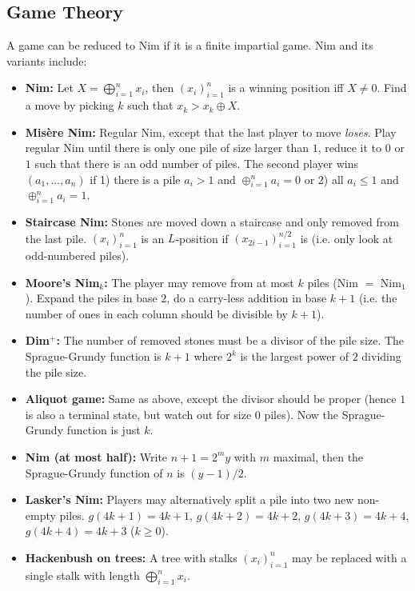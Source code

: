 \documentclass[8pt,a4paper,landscape,oneside]{amsart}
\newenvironment{myitemize}
{\begin{itemize}[leftmargin=.3cm]
	\setlength{\itemsep}{0pt}
	\setlength{\parskip}{0pt}
	\setlength{\parsep}{0pt}     }
{ \end{itemize}                  }
\begin{document}
\begin{multicols*}{3}
\section{Game Theory}
A game can be reduced to Nim if it is a finite impartial game.
Nim and its variants include:
\begin{myitemize}
	\item \textbf{Nim:} Let $X = \bigoplus_{i=1}^n x_i$, then $(x_i)_{i=1}^n$ is a winning position iff $X\neq 0$. Find a move by picking $k$ such that $x_k > x_k \oplus X$.
	\item \textbf{Mis\`{e}re Nim:} Regular Nim, except that the last player to move \textit{loses}. Play regular Nim until there is only one pile of size larger than $1$, reduce it to $0$ or $1$ such that there is an odd number of piles. The second player wins $(a_1, \dots, a_n)$ if 1) there is a pile $a_i > 1$ and $\oplus_{i=1}^{n} a_i = 0$ or 2) all $a_i \leq 1$ and $\oplus_{i=1}^{n} a_i = 1$.
	\item \textbf{Staircase Nim:} Stones are moved down a staircase and only removed from the last pile. $(x_i)_{i=1}^n$ is an $L$-position if $(x_{2i-1})_{i=1}^{n/2}$ is (i.e. only look at odd-numbered piles).
	\item \textbf{Moore's Nim$_k$:} The player may remove from at most $k$ piles (Nim $=$ Nim$_1$). Expand the piles in base $2$, do a carry-less addition in base $k+1$ (i.e. the number of ones in each column should be divisible by $k+1$).
	\item \textbf{Dim$^+$:} The number of removed stones must be a divisor of the pile size. The Sprague-Grundy function is $k+1$ where $2^k$ is the largest power of $2$ dividing the pile size.
	\item \textbf{Aliquot game:} Same as above, except the divisor should be proper (hence $1$ is also a terminal state, but watch out for size $0$ piles). Now the Sprague-Grundy function is just $k$.
	\item \textbf{Nim (at most half):} Write $n+1 = 2^my$ with $m$ maximal, then the Sprague-Grundy function of $n$ is $(y - 1) / 2$.
	\item \textbf{Lasker's Nim:} Players may alternatively split a pile into two new non-empty piles. $g(4k+1) = 4k+1$, $g(4k+2) = 4k+2$, $g(4k+3) = 4k+4$, $g(4k+4) = 4k+3$ ($k\geq 0$).
	\item \textbf{Hackenbush on trees:} A tree with stalks $(x_i)_{i=1}^n$ may be replaced with a single stalk with length $\bigoplus_{i=1}^n x_i$.
\end{myitemize}


\end{multicols*}
\end{document}
